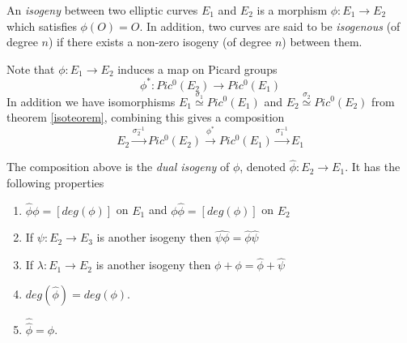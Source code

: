 \begin{mydef}
 An \emph{isogeny} between two elliptic curves $E_1$ and $E_2$ is a morphism $\phi: E_1 \rightarrow E_2$
which satisfies $\phi(O) = O$. In addition, two curves are said to be \emph{isogenous} (of degree $n$) 
if there exists a non-zero isogeny (of degree $n$) between them.
\end{mydef}

Note that $\phi: E_1 \rightarrow E_2$ induces a map on Picard groups
$$\phi^*: Pic^0(E_2) \rightarrow Pic^0(E_1)$$
In addition we have isomorphisms $E_1 \overset{\sigma_1}{\simeq} Pic^0(E_1)$ and 
$E_2 \overset{\sigma_2}{\simeq} Pic^0(E_2)$ from theorem \ref{isoteorem}, combining this gives a composition
$$ E_2 \overset{\sigma_2^{-1}}{\rightarrow} Pic^0(E_2) \overset{\phi^*}{\rightarrow} Pic^0(E_1)
\overset{\sigma_1^{-1}}{\rightarrow} E_1 $$

\begin{prop}
 The composition above is the \emph{dual isogeny} of $\phi$, denoted $\widehat{\phi}: E_2 \rightarrow E_1$.
It has the following properties 
\begin{enumerate}
 \item $\widehat{\phi}\phi = [deg(\phi)]$ on $E_1$ and $\phi\widehat{\phi} = [deg(\phi)]$ on $E_2$
 \item If $\psi: E_2 \rightarrow E_3$ is another isogeny then $\widehat{\psi \phi} = \widehat{\phi}\widehat{\psi}$
 \item If $\lambda: E_1 \rightarrow E_2$ is another isogeny then $\widehat{\phi+\phi} = \widehat{\phi}+\widehat{\psi}$
 \item $deg(\widehat{\phi}) = deg(\phi)$.
 \item $\widehat{\widehat{\phi}} = \phi$.
\end{enumerate}

\end{prop}

